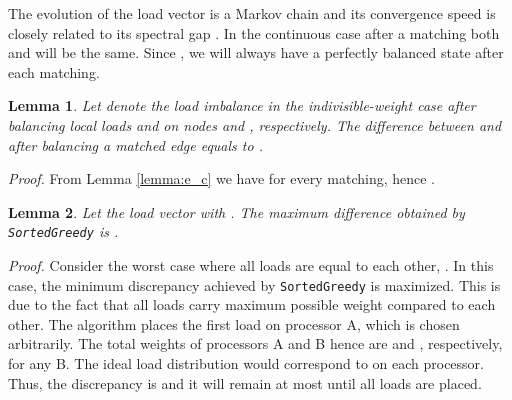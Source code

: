 \documentclass[12pt,psfig,a4]{article}
\newcommand{\sg}{\texttt{SortedGreedy}}
\newtheorem{mylemma}{Lemma}
\theoremstyle{plain}
\begin{document}
The evolution of the load vector is a Markov chain and its convergence speed is closely related to its spectral gap . In the continuous case after a matching  both  and  will be the same. Since , we will always have a perfectly balanced state after each matching. 

\begin{mylemma}
\label{lemma:d}
Let  denote the load imbalance in the indivisible-weight case after balancing local loads  and  on nodes  and , respectively. The difference  between  and  after balancing a matched edge equals to .
\end{mylemma}

\textit{Proof.} From Lemma \ref{lemma:e_c} we have  for every matching, hence . 

\begin{mylemma} 
\label{lemma:proof}
Let the load vector  with . The maximum difference  obtained by \sg{} is . 
\end{mylemma}

\textit{Proof.} Consider the worst case where all loads are equal to each other, . In this case, the minimum discrepancy achieved by \sg{} is maximized. This is due to the fact that all loads carry maximum possible weight compared to each other. The algorithm places the first load on processor A, which is chosen arbitrarily. The total weights of processors A and B hence are  and , respectively, for any B. The ideal load distribution would correspond to  on each processor. Thus, the discrepancy is  and it will remain at most  until all loads are placed.  
\end{document}
